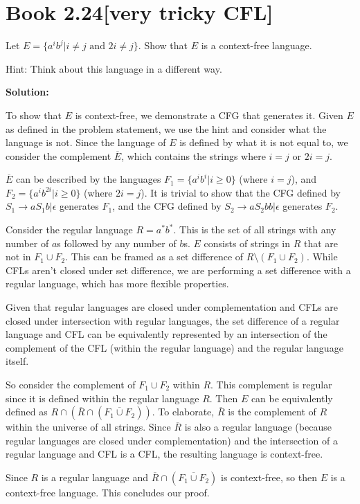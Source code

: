 \documentclass[11pt]{article}
\newcommand\union{\cup}
\newcommand\intersect{\cap}
\newenvironment{question}[2]
{\newpage\section{#1\texorpdfstring{\hfill}{horizontal spacing}{\rm\normalsize #2}}}{}
\newenvironment{solution}
{\textbf{Solution: }\color{blue}}
{\color{black}}
\begin{document}
\begin{question}{Book 2.24}{[very tricky CFL]}

Let \(E = \{ a^i b^j | i \neq j \text{ and } 2i \neq j \}\). Show that \(E\) is a context-free language.

Hint: Think about this language in a different way.

\begin{solution}

To show that \(E\) is context-free, we demonstrate a CFG that generates it. Given \(E\) as defined in the problem statement, we use the hint and consider what the language is not. Since the language of \(E\) is defined by what it is not equal to, we consider the complement \(\overline{E}\), which contains the strings where \(i = j\) or \(2i = j\).

\(\overline{E}\) can be described by the languages \(F_1 = \{a^i b^i | i \geq 0\}\) (where \(i=j\)), and \(F_2 = \{a^i b^{2i} | i \geq 0\}\) (where \(2i=j\)). It is trivial to show that the CFG defined by \(S_1 \rightarrow a S_1 b | \epsilon\) generates \(F_1\), and the CFG defined by \(S_2 \rightarrow a S_2 bb | \epsilon\) generates \(F_2\).

Consider the regular language \(R=a^* b^*\). This is the set of all strings with any number of \(a\)s followed by any number of \(b\)s. \(E\) consists of strings in \(R\) that are not in \(F_1 \union F_2\). This can be framed as a set difference of \(R \setminus (F_1 \union F_2)\). While CFLs aren't closed under set difference, we are performing a set difference with a regular language, which has more flexible properties.

Given that regular languages are closed under complementation and CFLs are closed under intersection with regular languages, the set difference of a regular language and CFL can be equivalently represented by an intersection of the complement of the CFL (within the regular language) and the regular language itself.

So consider the complement of \(F_1 \union F_2\) within \(R\). This complement is regular since it is defined within the regular language \(R\). Then \(E\) can be equivalently defined as \(R \intersect (\overline{R} \intersect (\overline{F_1 \union F_2}))\). To elaborate, \(\overline{R}\) is the complement of \(R\) within the universe of all strings. Since \(\overline{R}\) is also a regular language (because regular languages are closed under complementation) and the intersection of a regular language and CFL is a CFL, the resulting language is context-free.

Since \(R\) is a regular language and \(\overline{R} \intersect (\overline{F_1 \union F_2})\) is context-free, so then \(E\) is a context-free language. This concludes our proof.

\end{solution}
\end{question}
\end{document}
